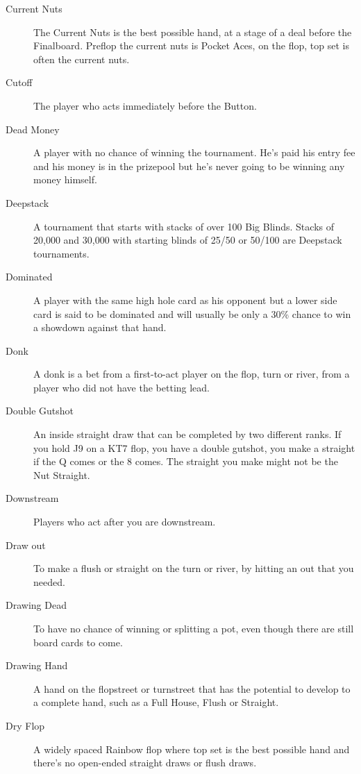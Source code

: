 \begin{description}
\item[Current Nuts] The Current Nuts is the best possible hand, at a
stage of a deal before the Finalboard. Preflop the current nuts is
Pocket Aces, on the flop, top set is often the current nuts.

\item[Cutoff] The player who acts immediately before the Button.

\item[Dead Money] A player with no chance of winning the tournament.
He's paid his entry fee and his money is in the prizepool but he's
never going to be winning any money himself.

\item[Deepstack] A tournament that starts with stacks of over 100 Big
Blinds. Stacks of 20,000 and 30,000 with starting blinds of 25/50 or
50/100 are Deepstack tournaments.

\item[Dominated] A player with the same high hole card as his opponent
but a lower side card is said to be dominated and will usually be
only a 30\% chance to win a showdown against that hand.

\item[Donk] A donk is a bet from a first-to-act player on the flop,
turn or river, from a player who did not have the betting lead.

\item[Double Gutshot] An inside straight draw that can be completed
by two different ranks. If you hold J9 on a KT7 flop, you have a double
gutshot, you make a straight if the Q comes or the 8 comes. The straight
you make might not be the Nut Straight.

\item[Downstream] Players who act after you are downstream.

\item[Draw out] To make a flush or straight on the turn or river, by
hitting an out that you needed.

\item[Drawing Dead] To have no chance of winning or splitting a pot,
even though there are still board cards to come.

\item[Drawing Hand] A hand on the flopstreet or turnstreet that has
the potential to develop to a complete hand, such as a Full House,
Flush or Straight.

\item[Dry Flop] A widely spaced Rainbow flop where top set is the best
possible hand and there's no open-ended straight draws or flush
draws.


\end{description}
